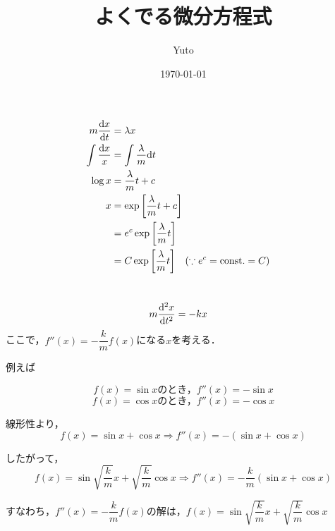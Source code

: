 \documentclass[uplatex]{jsarticle}
\title{ よくでる微分方程式 }
\date{\today}
\author{ Yuto }
\makeatletter
\def\mojiparline#1{
	\newcounter{mpl}
	\setcounter{mpl}{#1}
	\@tempdima=\linewidth
	\advance\@tempdima by-\value{mpl}zw
	\addtocounter{mpl}{-1}
	\divide\@tempdima by \value{mpl}
	\advance\kanjiskip by\@tempdima
	\advance\parindent by\@tempdima
}
\def\linesparpage#1{
	\baselineskip=\textheight
	\divide\baselineskip by #1
}
\makeatother
\begin{document}
\maketitle

\renewcommand{\thesection}{その\arabic{section}.}
\section{}

\begin{align*}
	m\dv{x}{t} &= \lambda x \\
	\int\dfrac{\mathrm{d}x}{x} &= \int \dfrac{\lambda }{m} \mathrm{d}t \\
	\log x &= \dfrac{\lambda }{m}t + c \\
	x &= \exp\qty[\dfrac{\lambda }{m}t + c] \\
	&= e^c\exp\qty[\dfrac{\lambda }{m}t] \\
	&= C\exp\qty[\dfrac{\lambda }{m}t] \qq{($\because e^c = \mathrm{const}. = C$)}
\end{align*}

\section{}

\begin{align*}
	m\dv[2]{x}{t} &= -kx
\end{align*}
ここで，$f''(x) = -\dfrac{k}{m}f(x)$になる$x$を考える．

例えば

$$f(x) = \sin x\mbox{のとき，}f''(x) = -\sin x$$
$$f(x) = \cos x\mbox{のとき，}f''(x) = -\cos x$$

線形性より，
\[
	f(x) = \sin x + \cos x
	\Rightarrow
	f''(x) = -(\sin x + \cos x)
\]

したがって，
\[
	f(x) = \sin \sqrt{\dfrac{k}{m}}x + \sqrt{\dfrac{k}{m}}\cos x
	\Rightarrow
	f''(x) = -\dfrac{k}{m}(\sin x + \cos x)
\]

すなわち，$f''(x) = -\dfrac{k}{m}f(x)$の解は，$f(x) = \sin \sqrt{\dfrac{k}{m}}x + \sqrt{\dfrac{k}{m}}\cos x$
\end{document}
